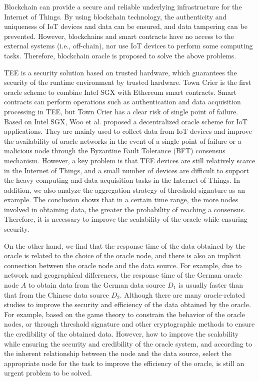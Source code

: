 \documentclass[paper]{ieice}
\begin{document}
Blockchain can provide a secure and reliable underlying infrastructure for the Internet of Things. By using blockchain technology, the authenticity and uniqueness of IoT devices and data can be ensured, and data tampering can be prevented\cite{rahman2022blockchain}. However, blockchains and smart contracts have no access to the external systems (i.e., off-chain), nor use IoT devices to perform some computing tasks. Therefore, blockchain oracle is proposed to solve the above problems\cite{pasdar2023connect,ezzat2022blockchain,bodkhe2020blockchain}.

TEE is a security solution based on trusted hardware, which guarantees the security of the runtime environment by trusted hardware\cite{jauernig2020trusted}. Town Crier\cite{zhang2016town} is the first oracle scheme to combine Intel SGX with Ethereum smart contracts. Smart contracts can perform operations such as authentication and data acquisition processing in TEE, but Town Crier has a clear risk of single point of failure. Based on Intel SGX, Woo et al.\cite{woo2020distributed} proposed a decentralized oracle scheme for IoT applications. They are mainly used to collect data from IoT devices and improve the availability of oracle networks in the event of a single point of failure or a malicious node through the Byzantine Fault Tolerance (BFT) consensus mechanism. However, a key problem is that TEE devices are still relatively scarce in the Internet of Things, and a small number of devices are difficult to support the heavy computing and data acquisition tasks in the Internet of Things\cite{jauernig2020trusted}. In addition, we also analyze the aggregation strategy of threshold signature as an example. The conclusion shows that in a certain time range, the more nodes involved in obtaining data, the greater the probability of reaching a consensus. Therefore, it is necessary to improve the scalability of the oracle while ensuring security.

On the other hand, we find that the response time of the data obtained by the oracle is related to the choice of the oracle node, and there is also an implicit connection between the oracle node and the data source. For example, due to network and geographical differences, the response time of the German oracle node $A$ to obtain data from the German data source $D_1$ is usually faster than that from the Chinese data source $D_2$.
Although there are many oracle-related studies to improve the security and efficiency of the data obtained by the oracle. For example, based on the game theory to constrain the behavior of the oracle nodes\cite{peterson2015augur,adler2018astraea}, or through threshold signature and other cryptographic methods to ensure the credibility of the obtained data\cite{chainlink,dos}. However, how to improve the scalability while ensuring the security and credibility of the oracle system, and according to the inherent relationship between the node and the data source, select the appropriate node for the task to improve the efficiency of the oracle, is still an urgent problem to be solved. 
\end{document}
